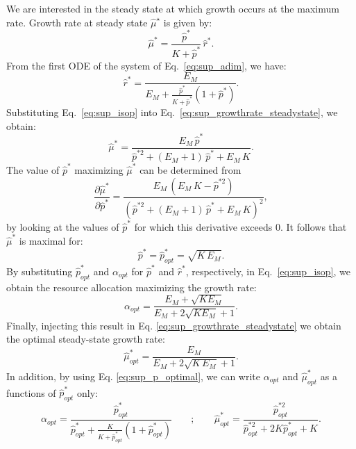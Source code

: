 We are interested in the steady state at which growth occurs at the maximum rate.
Growth rate at steady state $\hat{\mu}^\star$ is given by:
\begin{equation}
\label{eq:sup_growthrate_steadystate}
\hat{\mu}^* = \frac{\hat{p}^*}{K + \hat{p}^*} \, \hat{r}^* .
\end{equation}
From the first ODE of the system of Eq.~\ref{eq:sup_adim}, we have:
\begin{equation}
\label{eq:sup_isop}
\hat{r}^* = \frac{E_M}{E_M + \frac{\hat{p}^*}{K + \hat{p}^*} (1+\hat{p}^*)} .
\end{equation}
Substituting Eq.~\ref{eq:sup_isop} into Eq.~\ref{eq:sup_growthrate_steadystate}, we obtain:
\begin{equation}
\label{eq:sup_growthrate_steadystate_p}
\hat{\mu}^* = \frac{E_M \, \hat{p}^*}{\hat{p}^{* 2} + (E_M + 1)\, \hat{p}^* + E_M\, K} .
\end{equation}
The value of $\hat{p}^*$ maximizing $\hat{\mu}^*$ can be determined from
\begin{equation}
\label{eq:sup_growthrate_steadystate_deriv_p}
\frac{\partial\hat{\mu}^*}{\partial\hat{p}^*} = \frac{E_M \, (E_M\, K - \hat{p}^{*2})}{\left(\hat{p}^{* 2} + (E_M + 1)\, \hat{p}^* + E_M\, K\right)^2},
\end{equation}
by looking at the values of $\hat{p}^*$ for which this derivative exceeds 0.
It follows that $\hat{\mu}^*$ is maximal for:
\begin{equation}
\label{eq:sup_p_optimal}
\hat{p}^* = \hat{p}^*_{opt} = \sqrt{K\, E_M}.
\end{equation}
By substituting $\hat{p}^*_{opt}$ and $\alpha_{opt}$ for $\hat{p}^*$ and $\hat{r}^*$, respectively, in Eq.~\ref{eq:sup_isop}, we obtain the resource allocation maximizing the growth rate:
\begin{equation}
\label{eq:sup_alpha_optimal}
\alpha_{opt} = \frac{E_M + \sqrt{KE_M}}{E_M + 2\sqrt{KE_M} + 1}.
\end{equation}
Finally, injecting this result in Eq. \ref{eq:sup_growthrate_steadystate} we obtain the optimal steady-state growth rate:
\begin{equation}
\label{eq:sup_growthrate_optimal}
\hat{\mu}^*_{opt} = \frac{E_M}{E_M + 2\sqrt{K\, E_M} + 1}.
\end{equation}
In addition, by using Eq. \ref{eq:sup_p_optimal}, we can write $\alpha_{opt}$ and $\hat{\mu}_{opt}^*$ as a functions of $\hat{p}_{opt}^*$ only:
\begin{equation}
\label{eq:sup_alpha_mu_optimal_p}
\alpha_{opt} = \frac{\hat{p}^{*}_{opt}}{\hat{p}^{*}_{opt} + \frac{K}{K+\hat{p}^{*}_{opt}}(1+\hat{p}^{*}_{opt})}
\;\;\;\;\;\;\; ; \;\;\;\;\;\;\;
\hat{\mu}^*_{opt} = \frac{\hat{p}^{* 2}_{opt}}{\hat{p}^{* 2}_{opt} + 2K\hat{p}^*_{opt} + K}.
\end{equation}

